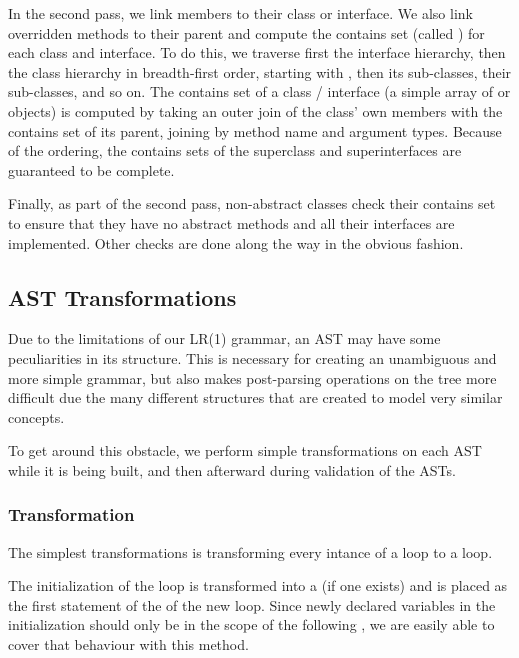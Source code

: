 \documentclass[pdftex,11pt,a4paper]{article}
\begin{document}
In the second pass, we link members to their class or interface. We
also link overridden methods to their parent and compute the contains
set (called ) for each class and interface. To do
this, we traverse first the interface hierarchy, then the class
hierarchy in breadth-first order, starting with
, then its sub-classes, their sub-classes, and
so on. The contains set of a class / interface (a simple array of
 or  objects) is computed by taking an outer
join of the class' own members with the contains set of its parent,
joining by method name and argument types. Because of the ordering,
the contains sets of the superclass and superinterfaces are guaranteed
to be complete.

Finally, as part of the second pass, non-abstract classes check their
contains set to ensure that they have no abstract methods and all
their interfaces are implemented. Other checks are done along the way
in the obvious fashion.



\subsection{AST Transformations}

Due to the limitations of our LR(1) grammar, an AST may have some
peculiarities in its structure. This is necessary for creating an
unambiguous and more simple grammar, but also makes post-parsing
operations on the tree more difficult due the many different
structures that are created to model very similar concepts.

To get around this obstacle, we perform simple transformations on each
AST while it is being built, and then afterward during validation of
the ASTs.

\subsubsection{ Transformation}

The simplest transformations is transforming every intance of a
 loop to a  loop.

The initialization of the  loop is transformed into a 
(if one exists) and is placed as the first statement of the  of
the new  loop. Since newly declared variables in the initialization
should only be in the scope of the following , we are easily able
to cover that behaviour with this method.
\end{document}
